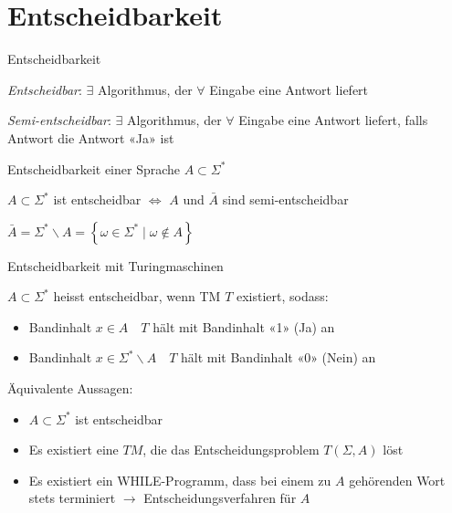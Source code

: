 \graphicspath{{images/}}

\section*{Entscheidbarkeit}

\begin{definition}{Entscheidbarkeit}
    
        \emph{Entscheidbar}: $\exists$ Algorithmus, der $\forall$ Eingabe eine Antwort liefert
        
        \emph{Semi-entscheidbar}: $\exists$ Algorithmus, der $\forall$ Eingabe eine Antwort liefert, falls Antwort die Antwort «Ja» ist
    
\end{definition}

\begin{theorem}{Entscheidbarkeit} einer Sprache $A \subset \Sigma^{*}$

    $A \subset \Sigma^{*}$ ist entscheidbar $\Leftrightarrow$ $A$ und $\bar{A}$ sind semi-entscheidbar

    \vspace{1mm}

    $\bar{A}=\Sigma^{*} \backslash A=\left\{\omega \in \Sigma^{*} \mid \omega \notin A\right\}$

\end{theorem}

\begin{concept}{Entscheidbarkeit mit Turingmaschinen}

    $A \subset \Sigma^{*}$ heisst entscheidbar, wenn TM $T$ existiert, sodass:
    \begin{itemize}
    \item Bandinhalt $x \in A \quad T$ hält mit Bandinhalt «1» (Ja) an
    \item Bandinhalt $x \in \Sigma^{*} \backslash A \quad T$ hält mit Bandinhalt «0» (Nein) an
    \end{itemize}

    \vspace{1mm}

    Äquivalente Aussagen:
    \begin{itemize}
        \item $A \subset \Sigma^{*}$ ist entscheidbar
        \item Es existiert eine $T M$, die das Entscheidungsproblem $T(\Sigma, A)$ löst
        \item Es existiert ein WHILE-Programm, dass bei einem zu $A$ gehörenden Wort stets terminiert $\rightarrow$ Entscheidungsverfahren für $A$
    \end{itemize}
\end{concept}

